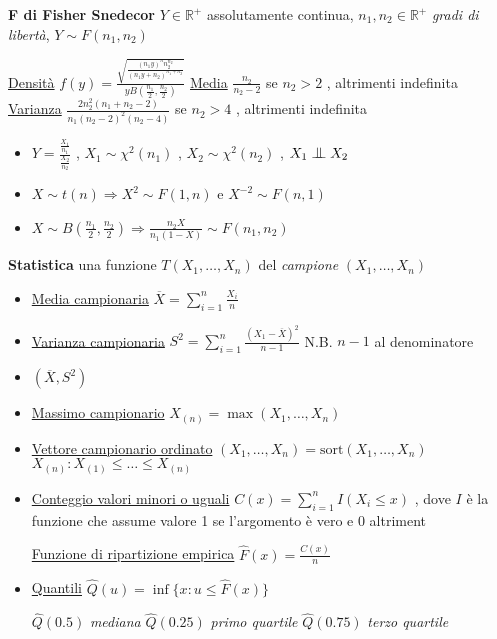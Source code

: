 \documentclass[openany]{book} %
\newcommand{\ind}{\mathrel{\text{\scalebox{1.07}{$\perp\mkern-10mu\perp$}}}}
\begin{document}
\textbf{F di Fisher Snedecor} $Y\in \mathbb{R}^+$ assolutamente continua, $n_1,n_2\in \mathbb{R}^+$ \textit{gradi di libertà}, $Y\sim F(n_1,n_2)$

\underline{Densità} $f(y)=\frac{\sqrt{\frac{(n_1y)^nn_2^{n_2}}{(n_1y+n_2)^{n_1+n_2}}}}{yB(\frac{n_1}{2},\frac{n_2}{2})}$ \qquad \underline{Media} $\frac{n_2}{n_2-2}$ se $n_2>2$ , altrimenti indefinita \qquad \underline{Varianza} $\frac{2n_2^2(n_1+n_2-2)}{n_1(n_2-2)^2(n_2-4)}$ se $n_2>4$ , altrimenti indefinita

\begin{itemize}

\item $Y=\frac{\frac{X_1}{n_1}}{\frac{X_2}{n_2}}$ , $X _1\sim\chi^2(n_1)$ , $X_2\sim\chi^2(n_2)$ , $X_1\ind X_2$

\item $X\sim t(n) \Rightarrow X^2\sim F(1,n)$ e $X^{-2}\sim F(n,1)$

\item $X\sim B(\frac{n_1}{2},\frac{n_2}{2}) \Rightarrow \frac{n_2X}{n_1(1-X)}\sim F(n_1,n_2)$

\end{itemize}

\textbf{Statistica} una funzione $T(X_1,\dots,X_n)$ del \textit{campione} $(X_1,\dots,X_n)$

\begin{itemize}

\item \underline{Media campionaria} $\overline{X}=\sum_{i=1}^n \frac{X_i}{n}$

\item \underline{Varianza campionaria} $S^2=\sum_{i=1}^n \frac{(X_1-\overline {X})^2}{n-1}$ N.B. $n-1$ al denominatore

\item $(\overline {X},S^2)$

\item \underline{Massimo campionario} $X_{(n)}=\max(X_1,\dots,X_n)$

\item \underline{Vettore campionario ordinato} $(X_1,\dots,X_n)=\text{sort}(X_1,\dots,X_n)$ \quad $X_{(n)}:X_{(1)}\leq\dots\leq X_{(n)}$

\item \underline{Conteggio valori minori o uguali} $C(x)=\sum_{i=1}^nI(X_i\leq x)$ , dove $I$ è la funzione che assume valore 1 se l'argomento è vero e 0 altriment

\underline{Funzione di ripartizione empirica} $\hat {F}(x)=\frac{C(x)}{n}$

\item \underline{Quantili} $\hat {Q}(u)=\inf\{x:u\leq\hat {F}(x)\}$

$\hat {Q}(0.5)$ \textit{mediana} \quad $\hat {Q}(0.25)$ \textit{primo quartile} \quad $\hat {Q}(0.75)$ \textit{terzo quartile}

\end{itemize}
\end{document}
